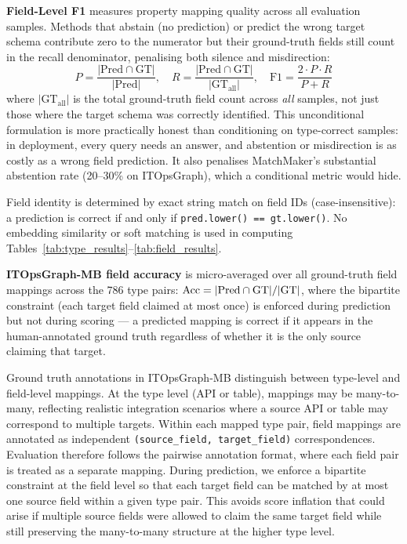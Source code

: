 \documentclass[sigconf, nonacm]{acmart}
\begin{document}
\textbf{Field-Level F1} measures property mapping quality across all evaluation samples. Methods that abstain (no prediction) or predict the wrong target schema contribute zero to the numerator but their ground-truth fields still count in the recall denominator, penalising both silence and misdirection:
\begin{equation}
P = \frac{|\text{Pred} \cap \text{GT}|}{|\text{Pred}|}, \quad
R = \frac{|\text{Pred} \cap \text{GT}|}{|\text{GT}_{\text{all}}|}, \quad
\text{F1} = \frac{2 \cdot P \cdot R}{P + R}
\end{equation}
where $|\text{GT}_{\text{all}}|$ is the total ground-truth field count across \emph{all} samples, not just those where the target schema was correctly identified. This unconditional formulation is more practically honest than conditioning on type-correct samples: in deployment, every query needs an answer, and abstention or misdirection is as costly as a wrong field prediction. It also penalises MatchMaker's substantial abstention rate (20--30\% on ITOpsGraph), which a conditional metric would hide.

Field identity is determined by exact string match on field IDs (case-insensitive): a prediction is correct if and only if \texttt{pred.lower() == gt.lower()}. No embedding similarity or soft matching is used in computing Tables~\ref{tab:type_results}--\ref{tab:field_results}.

\textbf{ITOpsGraph-MB field accuracy} is micro-averaged over all ground-truth field mappings across the 786 type pairs: $\text{Acc} = |{\rm Pred} \cap {\rm GT}| / |{\rm GT}|$, where the bipartite constraint (each target field claimed at most once) is enforced during prediction but not during scoring — a predicted mapping is correct if it appears in the human-annotated ground truth regardless of whether it is the only source claiming that target.

Ground truth annotations in ITOpsGraph-MB distinguish between type-level and field-level mappings. At the type level (API or table), mappings may be many-to-many, reflecting realistic integration scenarios where a source API or table may correspond to multiple targets. Within each mapped type pair, field mappings are annotated as independent \texttt{(source\_field, target\_field)} correspondences. Evaluation therefore follows the pairwise annotation format, where each field pair is treated as a separate mapping. During prediction, we enforce a bipartite constraint at the field level so that each target field can be matched by at most one source field within a given type pair. This avoids score inflation that could arise if multiple source fields were allowed to claim the same target field while still preserving the many-to-many structure at the higher type level.
\end{document}

